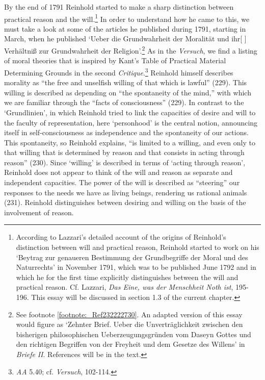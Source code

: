 By the end of 1791 Reinhold started to make a sharp distinction between practical reason and the will.\footnote{\label{footnote:_Ref232226383} According to Lazzari's detailed account of the origins of Reinhold's distinction between will and practical reason, Reinhold started to work on his `Beytrag zur genaueren Bestimmung der Grundbegriffe der Moral und des Naturrechts' in November 1791, which was to be published June 1792 and in which he for the first time explicitly distinguishes between the will and practical reason. Cf. Lazzari, \textit{Das Eine, was der Menschheit Noth ist}, 195{-}196. This essay will be discussed in section 1.3 of the current chapter. } In order to understand how he came to this, we must take a look at some of the articles he published during 1791, starting in March, when he published `Ueber die Grundwahrheit der Moralit\"{a}t und ihr[ ] Verh\"{a}ltni\ss{} zur Grundwahrheit der Religion'.\footnote{ See footnote \ref{footnote:_Ref232222730}. An adapted version of this essay would figure as `Zehnter Brief. Ueber die Unvertr\"{a}glichkeit zwischen den bisherigen philosophischen Ueberzeugungsgr\"{u}nden vom Daseyn Gottes und den richtigen Begriffen von der Freyheit und dem Gesetze des Willens' in \textit{Briefe} \textit{II}. References will be in the text.} As in the \textit{Versuch}, we find a listing of moral theories that is inspired by Kant's Table of Practical Material Determining Grounds in the second \textit{Critique}.\footnote{\label{footnote:_Ref232237843} \textit{AA} 5.40; cf. \textit{Versuch}, 102{-}114. } Reinhold himself describes morality as ``the free and unselfish willing of that which is lawful'' (229). This willing is described as depending on ``the spontaneity of the mind,'' with which we are familiar through the ``facts of consciousness'' (229). In contrast to the `Grundlinien', in which Reinhold tried to link the capacities of desire and will to the faculty of representation, here `personhood' is the central notion, announcing itself in self{-}consciousness as independence and the spontaneity of our actions. This spontaneity, so Reinhold explains, ``is limited to a willing, and even only to that willing that is determined by reason and that consists in acting through reason'' (230). Since `willing' is described in terms of `acting through reason', Reinhold does not appear to think of the will and reason as separate and independent capacities. The power of the will is described as ``steering'' our responses to the needs we have as living beings, rendering us rational animals (231). Reinhold distinguishes between desiring and willing on the basis of the involvement of reason. 

